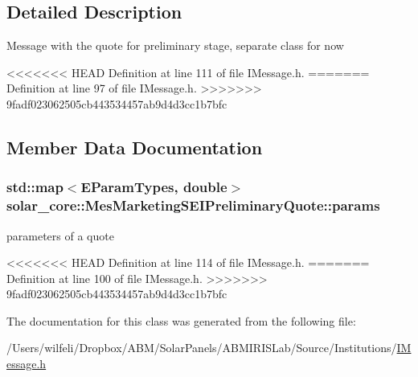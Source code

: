 \subsection{Detailed Description}
Message with the quote for preliminary stage, separate class for now 

<<<<<<< HEAD
Definition at line 111 of file I\+Message.\+h.
=======
Definition at line 97 of file I\+Message.\+h.
>>>>>>> 9fadf023062505cb443534457ab9d4d3cc1b7bfc



\subsection{Member Data Documentation}
\hypertarget{classsolar__core_1_1_mes_marketing_s_e_i_preliminary_quote_abe529e6fd227f28d2aab0c6df56e998d}{}
\subsubsection[{params}]{\setlength{\rightskip}{0pt plus 5cm}std\+::map$<${\bf E\+Param\+Types}, double$>$ solar\+\_\+core\+::\+Mes\+Marketing\+S\+E\+I\+Preliminary\+Quote\+::params}\label{classsolar__core_1_1_mes_marketing_s_e_i_preliminary_quote_abe529e6fd227f28d2aab0c6df56e998d}
parameters of a quote 

<<<<<<< HEAD
Definition at line 114 of file I\+Message.\+h.
=======
Definition at line 100 of file I\+Message.\+h.
>>>>>>> 9fadf023062505cb443534457ab9d4d3cc1b7bfc



The documentation for this class was generated from the following file\+:\begin{DoxyCompactItemize}
\item 
/\+Users/wilfeli/\+Dropbox/\+A\+B\+M/\+Solar\+Panels/\+A\+B\+M\+I\+R\+I\+S\+Lab/\+Source/\+Institutions/\hyperlink{_i_message_8h}{I\+Message.\+h}\end{DoxyCompactItemize}
